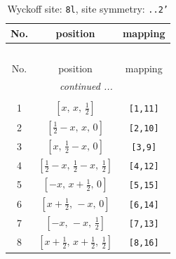 \documentclass[fleqn,8pt]{jsarticle}
\begin{document}
\begin{longtable}{ccc}
\caption{Wyckoff site: {\tt 8l}, site symmetry: {\tt ..2'}}
 \\
 \hline \hline
No. & position & mapping \\ \hline \endfirsthead

\multicolumn{2}{l}{\tablename\ \thetable{}} \\
 \hline \hline
No. & position & mapping \\ \hline \endhead

 \hline \hline
\multicolumn{2}{r}{\footnotesize\it continued ...} \\ \endfoot

 \hline \hline
\multicolumn{2}{r}{} \\ \endlastfoot

1 & $\left[ x,\, x,\, \frac{1}{2} \right]$ & {\tt [1,11]} \\ \hline
2 & $\left[ \frac{1}{2} - x,\, x,\, 0 \right]$ & {\tt [2,10]} \\ \hline
3 & $\left[ x,\, \frac{1}{2} - x,\, 0 \right]$ & {\tt [3,9]} \\ \hline
4 & $\left[ \frac{1}{2} - x,\, \frac{1}{2} - x,\, \frac{1}{2} \right]$ & {\tt [4,12]} \\ \hline
5 & $\left[ - x,\, x + \frac{1}{2},\, 0 \right]$ & {\tt [5,15]} \\ \hline
6 & $\left[ x + \frac{1}{2},\, - x,\, 0 \right]$ & {\tt [6,14]} \\ \hline
7 & $\left[ - x,\, - x,\, \frac{1}{2} \right]$ & {\tt [7,13]} \\ \hline
8 & $\left[ x + \frac{1}{2},\, x + \frac{1}{2},\, \frac{1}{2} \right]$ & {\tt [8,16]} \\
\end{longtable}
\renewcommand{\arraystretch}{1.2}
\end{document}
